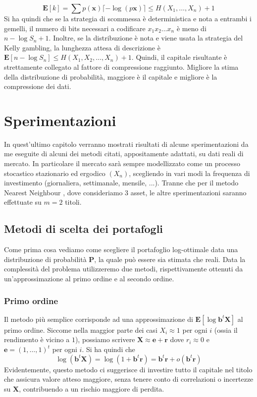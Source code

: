 \documentclass[a4paper,11pt]{book}
\theoremstyle{plain}
\theoremstyle{definition}
\theoremstyle{remark}
\newcommand{\X}{\bm{X}}
\newcommand{\x}{\bm{x}}
\newcommand{\B}{\bm{b}}
\newcommand{\Pro}{\mathbf{P}}
\newcommand{\E}{\mathbf{E}}
\begin{document}
\begin{equation*}
	\E[k] = \sum p(\x)\lceil -\log (p\x)\rceil\leq H(X_1,\ldots,X_n)+1
\end{equation*}
Si ha quindi che se la strategia di scommessa è deterministica e nota a entrambi i gemelli, il numero di bits necessari a codificare $x_1x_2\ldots x_n$ è meno di $n-\log S_n+1$. Inoltre, se la distribuzione è nota e viene usata la strategia del Kelly gambling, la lunghezza attesa di descrizione è $\E[n-\log S_n]\leq H(X_1,X_2,\ldots, X_n)+1$. Quindi, il capitale risultante è strettamente collegato al fattore di compressione raggiunto. Migliore la stima della distribuzione di probabilità, maggiore è il capitale e migliore è la compressione dei dati.

\chapter{Sperimentazioni}
In quest'ultimo capitolo verranno mostrati risultati di alcune sperimentazioni da me eseguite di alcuni dei metodi citati, appositamente adattati, su dati reali di mercato.\newline
In particolare il mercato sarà sempre modellizzato come un processo stocastico stazionario ed ergodico $(X_n)$, scegliendo in vari modi la frequenza di investimento (giornaliera, settimanale, mensile, ...). Tranne che per il metodo Nearest Neighbour \cite{NN}, dove consideriamo $3$ asset, le altre sperimentazioni saranno effettuate su $m=2$ titoli.
\section{Metodi di scelta dei portafogli}
Come prima cosa vediamo come scegliere il portafoglio log-ottimale data una distribuzione di probabilità $\Pro$, la quale può essere sia stimata che reali. Data la complessità del problema utilizzeremo due metodi, rispettivamente ottenuti da un'approssimazione al primo ordine e al secondo ordine.
\subsection{Primo ordine}
Il metodo più semplice corrisponde ad una approssimazione di $\E[\log \B^t\X]$ al primo ordine. Siccome nella maggior parte dei casi $X_i\approx 1$ per ogni $i$ (ossia il rendimento è vicino a $1$), possiamo scrivere $\X \approx \bm{e}+\bm{r}$ dove $r_i\approx 0$ e $\bm{e}=(1,\ldots, 1)^t$ per ogni $i$.\newline
Si ha quindi che
\begin{equation*}
	\log(\B^t\X) = \log(1+\B^t\bm{r})=\B^t\bm{r}+o(\B^t\bm{r})
\end{equation*}
Evidentemente, questo metodo ci suggerisce di investire tutto il capitale nel titolo che assicura valore atteso maggiore, senza tenere conto di correlazioni o incertezze su $\X$, contribuendo a un rischio maggiore di perdita.
\end{document}
